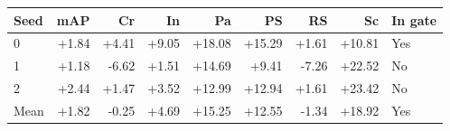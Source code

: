 \begin{tabular}{lrrrrrrrl}\hline
Seed & mAP & Cr & In & Pa & PS & RS & Sc & In gate \\ \hline
0 & +1.84 & +4.41 & +9.05 & +18.08 & +15.29 & +1.61 & +10.81 & Yes \\
1 & +1.18 & -6.62 & +1.51 & +14.69 & +9.41 & -7.26 & +22.52 & No \\
2 & +2.44 & +1.47 & +3.52 & +12.99 & +12.94 & +1.61 & +23.42 & No \\
Mean & +1.82 & -0.25 & +4.69 & +15.25 & +12.55 & -1.34 & +18.92 & Yes \\
\hline\end{tabular}

